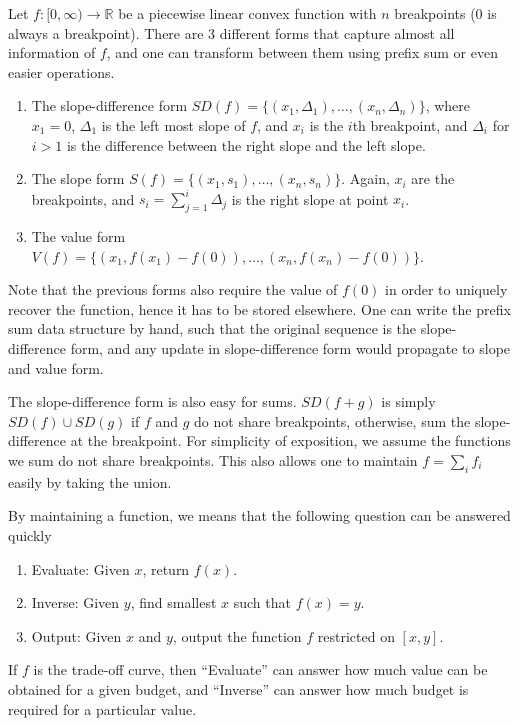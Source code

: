 \documentclass{article}
\newcommand{\R}{\mathbb{R}}
\begin{document}
Let $f:[0,\infty) \to \R$ be a piecewise linear convex function with $n$ breakpoints ($0$ is always a breakpoint). There are 3 different forms that capture almost all information of $f$, and one can transform between them using prefix sum or even easier operations.

\begin{enumerate}
    \item The slope-difference form $SD(f) = \{(x_1,\Delta_1),\ldots,\allowbreak (x_n,\Delta_n)\}$, where $x_1=0$, $\Delta_1$ is the left most slope of $f$, and $x_i$ is the $i$th breakpoint, and $\Delta_i$ for $i>1$ is the difference between the right slope and the left slope.
    \item The slope form $S(f) = \{(x_1,s_1),\ldots,(x_n,s_n)\}$. Again, $x_i$ are the breakpoints, and $s_i=\sum_{j=1}^i \Delta_j$ is the right slope at point $x_i$.
    \item The value form $V(f) = \{(x_1,f(x_1)-f(0)),\ldots, \allowbreak (x_n,f(x_n)-f(0))\}$.
\end{enumerate}

Note that the previous forms also require the value of $f(0)$ in order to uniquely recover the function, hence it has to be stored elsewhere. 
One can write the prefix sum data structure by hand, such that the original sequence is the slope-difference form, and any update in slope-difference form would propagate to slope and value form.

The slope-difference form is also easy for sums. $SD(f+g)$ is simply $SD(f)\cup SD(g)$ if $f$ and $g$ do not share breakpoints, otherwise, sum the slope-difference at the breakpoint. For simplicity of exposition, we assume the functions we sum do not share breakpoints. This also allows one to maintain $f=\sum_{i} f_i$ easily by taking the union.

By maintaining a function, we means that the following question can be answered quickly
\begin{enumerate}\label{enum:operations}
\item Evaluate: Given $x$, return $f(x)$.
\item Inverse: Given $y$, find smallest $x$ such that $f(x)=y$.
\item Output: Given $x$ and $y$, output the function $f$ restricted on $[x,y]$.
\end{enumerate}

If $f$ is the trade-off curve, then ``Evaluate'' can answer how much value can be obtained for a given budget, and ``Inverse'' can answer how much budget is required for a particular value.
\end{document}
